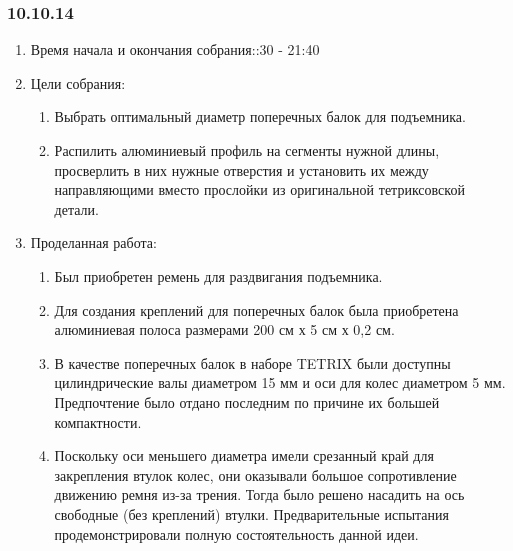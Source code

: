 
\subsubsection{10.10.14}

\begin{enumerate}
	\item Время начала и окончания собрания::30 - 21:40
	\item Цели собрания:\newline
	\begin{enumerate}
	  \item Выбрать оптимальный диаметр поперечных балок для подъемника.\newline
	  
	  \item Распилить алюминиевый профиль на сегменты нужной длины, просверлить в них нужные отверстия и установить их между направляющими вместо прослойки из оригинальной тетриксовской детали.\newline
	  
    \end{enumerate}
	\item Проделанная работа:\newline
	\begin{enumerate}
	  \item Был приобретен ремень для раздвигания подъемника.\newline
      
      \item  Для создания креплений для поперечных балок была приобретена алюминиевая полоса размерами 200 см х 5 см х 0,2 см.\newline
      
      \item В качестве поперечных балок в наборе TETRIX были доступны цилиндрические валы диаметром 15 мм и оси для колес диаметром 5 мм. Предпочтение было отдано последним по причине их большей компактности.\newline
       
      \item Поскольку оси меньшего диаметра имели срезанный край для закрепления втулок колес, они оказывали большое сопротивление движению ремня из-за трения. Тогда было решено насадить на ось свободные (без креплений) втулки. Предварительные испытания продемонстрировали полную состоятельность данной идеи.\newline
        

\end{enumerate}
\end{enumerate}
